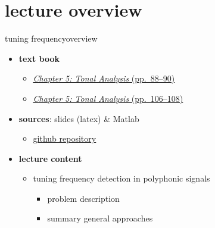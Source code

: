 

\subtitle{Part 6.5: Tuning Frequency Estimation}


	

    \section[overview]{lecture overview}
        \begin{frame}{tuning frequency}{overview}
            \begin{itemize}
                \item   \textbf{text book}  
                    \begin{itemize}
                        \item   \href{http://ieeexplore.ieee.org/xpl/articleDetails.jsp?tp=&arnumber=6331122&}{\underline{\textit{Chapter 5: Tonal Analysis} (pp.~88--90)}}
                        \item   \href{http://ieeexplore.ieee.org/xpl/articleDetails.jsp?tp=&arnumber=6331122&}{\underline{\textit{Chapter 5: Tonal Analysis} (pp.~106--108)}}
                    \end{itemize}
                \item   \textbf{sources}: slides (latex) \& Matlab  
                    \begin{itemize}
                        \item   \href{https://github.com/alexanderlerch/ACA-Slides}{\underline{github repository}}
                    \end{itemize}
                \bigskip
                \item<2->   \textbf{lecture content}
                    \begin{itemize}
                        \item<2->   tuning frequency detection in polyphonic signals
                            \begin{itemize}
                                \item   problem description
                                \item   summary general approaches
                            \end{itemize}
                    \end{itemize}
            \end{itemize}
        \end{frame}

